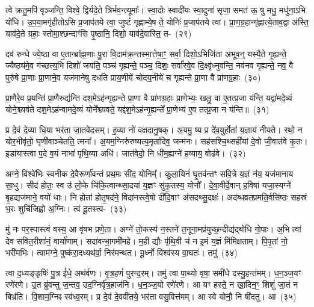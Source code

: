 {\anuvakamend[{उ॒प॒या॒मगृ॑हीतो जुहोमि॒ त्रिच॑त्वारिꣳशच्च}]}

त्वे क्रतु॒मपि॑ वृञ्जन्ति॒ विश्वे॒ द्विर्यदे॒ते त्रिर्भव॒न्त्यूमाः᳚। स्वा॒दोः स्वादी॑यः स्वा॒दुना॑ सृजा॒ समत॑ ऊ॒ षु मधु॒ मधु॑ना॒ऽभि यो॑धि। उ॒प॒या॒मगृ॑हीतो\-ऽसि प्र॒जा\-प॑तये त्वा॒ जुष्टं॑ गृह्णाम्ये॒ष ते॒ योनिः॑ प्र॒जा\-प॑तये त्वा। प्रा॒ण॒ग्र॒हान्गृ॑ह्णात्ये॒ताव॒द्वा अ॑स्ति॒ याव॑दे॒ते ग्रहाः॒ स्तोमा॒श्छन्दाꣳ॑सि पृ॒ष्ठानि॒ दिशो॒ याव॑दे॒वास्ति॒ त-~(२९)\ip

दव॑ रुन्धे ज्ये॒ष्ठा वा ए॒तान्ब्रा᳚ह्म॒णाः पु॒रा वि॒दाम॑क्र॒न्तस्मा॒त्तेषा॒ꣳ॒ सर्वा॒ दिशो॒\-ऽभिजि॑ता अभूव॒न्॒ यस्यै॒ते गृ॒ह्यन्ते॒ ज्यैष्ठ्य॑मे॒व ग॑च्छत्य॒भि दिशो॑ जयति॒ पञ्च॑ गृह्यन्ते॒ पञ्च॒ दिशः॒ सर्वा᳚स्वे॒व दि॒क्ष्वृ॑ध्नुवन्ति॒ नव॑नव गृह्यन्ते॒ नव॒ वै पुरु॑षे प्रा॒णाः प्रा॒णाने॒व यज॑मानेषु दधति प्राय॒णीये॑ चोदय॒नीये॑ च गृह्यन्ते प्रा॒णा वै प्रा॑णग्र॒हाः~(३०)\ip

प्रा॒णैरे॒व प्र॒यन्ति॑ प्रा॒णैरुद्य॑न्ति दश॒मे\-ऽह॑न्गृह्यन्ते प्रा॒णा वै प्रा॑णग्र॒हाः प्रा॒णेभ्यः॒ खलु॒ वा ए॒तत्प्र॒जा य॑न्ति॒ यद्वा॑मदे॒व्यं योने॒श्च्यव॑ते दश॒मे\-ऽह॑न्वामदे॒व्यं योने᳚श्च्यवते॒ यद्द॑श॒मे\-ऽह॑न्गृ॒ह्यन्ते᳚ प्रा॒णेभ्य॑ ए॒व तत्प्र॒जा न य॑न्ति॥~(३१)\ip

{\anuvakamend[{तत्प्रा॑णग्र॒हाः स॒प्तत्रिꣳ॑शच्च}]}%

प्र दे॒वं दे॒व्या धि॒या भर॑ता जा॒तवे॑दसम्। ह॒व्या नो॑ वक्षदा\-नु॒षक्। अ॒यमु॒ ष्य प्र दे॑व॒युर्\mbox{}होता॑ य॒ज्ञाय॑ नीयते। रथो॒ न यो\-र॒भी\-वृ॑तो॒ घृणी॑वाञ्चेतति॒ त्मना᳚। अ॒यम॒ग्निरु॑रुष्यत्य॒मृता॑दिव॒ जन्म॑नः। सह॑सश्चि॒थ्सही॑यां दे॒वो जी॒वात॑वे कृ॒तः। इडा॑यास्त्वा प॒दे व॒यं नाभा॑ पृथि॒व्या अधि॑। जात॑वेदो॒ नि धी॑म॒ह्यग्ने॑ ह॒व्याय॒ वोढ॑वे।~(३२)\ip

अग्ने॒ विश्वे॑भिः स्वनीक दे॒वैरूर्णा॑वन्तं प्रथ॒मः सी॑द॒ योनिम्᳚। कु॒ला॒यिनं॑ घृ॒तव॑न्तꣳ सवि॒त्रे य॒ज्ञं न॑य॒ यज॑मानाय सा॒धु। सीद॑ होतः॒ स्व उ॑ लो॒के चि॑कि॒त्वान्थ्सा॒दया॑ य॒ज्ञꣳ सु॑कृ॒तस्य॒ योनौ᳚। दे॒वा॒वीर्दे॒वान् ह॒विषा॑ यजा॒स्यग्ने॑ बृ॒हद्यज॑माने॒ वयो॑ धाः। नि होता॑ होतृ॒षद॑ने॒ विदा॑नस्त्वे॒षो दी॑दि॒वाꣳ अ॑सदथ्सु॒दक्षः॑। अद॑ब्ध\-व्रत\-प्रमति॒र्वसि॑ष्ठः सहस्रं भ॒रः शुचि॑जिह्वो अ॒ग्निः। त्वं दू॒तस्त्व-~(३३)\ip

मु॑ नः पर॒स्पास्त्वं वस्य॒ आ वृ॑षभ प्रणे॒ता। अग्ने॑ तो॒कस्य॑ न॒स्तने॑ त॒नूना॒मप्र॑\-युच्छ॒न्दीद्य॑द्बोधि गो॒पाः। अ॒भि त्वा॑ देव सवित॒रीशा॑नं॒ वार्या॑णाम्। सदा॑वन्भा॒गमी॑महे। म॒ही द्यौः पृ॑थि॒वी च॑ न इ॒मं य॒ज्ञं मि॑मिक्षताम्। पि॒पृ॒तां नो॒ भरी॑मभिः। त्वाम॑ग्ने॒ पुष्क॑रा॒दध्यथ॑र्वा॒ निर॑मन्थत। मू॒र्ध्नो विश्व॑स्य वा॒घतः॑। तमु॑~(३४)\ip

त्वा द॒ध्यङ्ङृषिः॑ पु॒त्र ई॑धे॒ अथ॑र्वणः। वृ॒त्र॒हणं॑ पुरन्द॒रम्। तमु॑ त्वा पा॒थ्यो वृषा॒ समी॑धे दस्यु॒हन्त॑मम्। ध॒न॒ञ्ज॒यꣳ रणे॑रणे। उ॒त ब्रु॑वन्तु ज॒न्तव॒ उद॒ग्निर्वृ॑त्र॒हाज॑नि। ध॒न॒ञ्ज॒यो रणे॑रणे। आ यꣳ हस्ते॒ न खा॒दिन॒ꣳ॒ शिशुं॑ जा॒तं न बिभ्र॑ति। वि॒शाम॒ग्निꣴ स्व॑ध्व॒रम्। प्र दे॒वं दे॒ववी॑तये॒ भर॑ता वसु॒वित्त॑मम्। आ स्वे योनौ॒ नि षी॑दतु। आ~(३५)\ip


